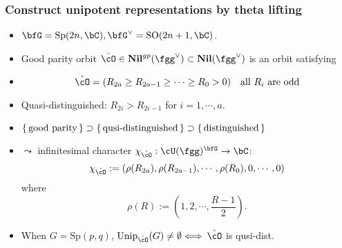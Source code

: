 \documentclass[t,mathserif,11pt,handout,usenames,dvipsnames]{beamer}
\theoremstyle{plain}
\theoremstyle{definition}
\newcommand{\SO}{\mathrm{SO}}
\def\Sp{{\mathrm{Sp}}}
\def\Unip{{\mathrm{Unip}}}
\def\ckcO{{\check{\cO}}}
\def\Nil{\mathbf{Nil}}
\def\lblue{\color{blue}}
\begin{document}
\begin{frame}[label=CG]
  \frametitle{Construct unipotent representations by theta lifting}
  \begin{itemize}[<+->]
  \item $\bfG = \Sp(2n,\bC), \bfG^\vee = \SO(2n+1,\bC)$.

  \item {\lblue Good parity} orbit $\ckcO \in
    \Nil^{gp}(\fgg^\vee)\subset \Nil(\fgg^\vee)$ is an orbit satisfying
  \item []
    \vspace{-1em}
    \[
      \ckcO = (R_{2a}\geq R_{2a-1}\geq \cdots\geq R_0>0)\quad \text{all $R_i$
        are odd}
    \]
  \item {\lblue Quasi-distinguished}: 
   $R_{2i}> R_{2i-1}$ for $i = 1, \cdots, a$.  
  \item 
    $\set{\text{good parity}}\supset
      \set{\text{qusi-distinguished}}\supset \set{\text{distinguished}}$
  \item $\leadsto$ infinitesimal character
    $\chi_{ \ckcO}: \cU(\fgg)^{\bfG}\rightarrow \bC$:
    \[
      \chi_{\ckcO}:= (\rho(
      R_{2a}), \rho(R_{2a-1}), \cdots, \rho(R_0), 0,  \cdots, 0 )
    \]
    where
    \[
      \rho(R):= (1, 2, \cdots, \frac{R-1}{2}).
    \]
   \item When $G = \Sp(p,q)$,  $\Unip_{\ckcO}(G) \neq  \emptyset \Longleftrightarrow $ $\ckcO$ is qusi-dist. 
  \end{itemize}
\end{frame}
\end{document}
